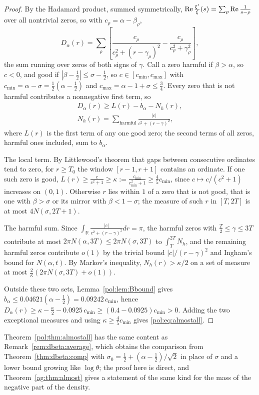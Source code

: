\begin{proof}
By the Hadamard product, summed symmetrically, $\operatorname{Re}\frac{\xi'}{\xi}(s)=\sum_\rho\operatorname{Re}\frac{1}{s-\rho}$ over all nontrivial zeros, so with $c_\rho=\alpha-\beta_\rho$,
\[
D_\alpha(r)=\sum_\rho\left[\frac{c_\rho}{c_\rho^2+(r-\gamma_\rho)^2}-\frac{c_\rho}{c_\rho^2+\gamma_\rho^2}\right],
\]
the sum running over zeros of both signs of $\gamma$. Call a zero harmful if $\beta>\alpha$, so $c<0$, and good if $|\beta-\frac12|\le\sigma-\frac12$, so $c\in[c_{\min},c_{\max}]$ with $c_{\min}=\alpha-\sigma=\frac12(\alpha-\frac12)$ and $c_{\max}=\alpha-1+\sigma\le\frac34$. Every zero that is not harmful contributes a nonnegative first term, so
\[
\begin{gathered}
D_\alpha(r)\ge L(r)-b_\alpha-N_h(r),\\
N_h(r)=\sum_{\text{harmful}}\frac{|c|}{c^2+(r-\gamma)^2},
\end{gathered}
\]
where $L(r)$ is the first term of any one good zero; the second terms of all zeros, harmful ones included, sum to $b_\alpha$.

The local term. By Littlewood's theorem \cite{Littlewood24} that gaps between consecutive ordinates tend to zero, for $r\ge T_0$ the window $[r-1,r+1]$ contains an ordinate. If one such zero is good, $L(r)\ge\frac{c}{c^2+1}\ge\kappa:=\frac{c_{\min}}{c_{\min}^2+1}\ge\frac45c_{\min}$, since $c\mapsto c/(c^2+1)$ increases on $(0,1)$. Otherwise $r$ lies within $1$ of a zero that is not good, that is one with $\beta>\sigma$ or its mirror with $\beta<1-\sigma$; the measure of such $r$ in $[T,2T]$ is at most $4N(\sigma,2T+1)$.

The harmful sum. Since $\int_{\mathbb R}\frac{|c|}{c^2+(r-\gamma)^2}dr=\pi$, the harmful zeros with $\frac T2\le\gamma\le3T$ contribute at most $2\pi N(\alpha,3T)\le2\pi N(\sigma,3T)$ to $\int_T^{2T}N_h$, and the remaining harmful zeros contribute $o(1)$ by the trivial bound $|c|/(r-\gamma)^2$ and Ingham's bound for $N(\alpha,t)$. By Markov's inequality, $N_h(r)>\kappa/2$ on a set of measure at most $\frac2\kappa(2\pi N(\sigma,3T)+o(1))$.

Outside these two sets, Lemma~\ref{pol:lem:Bbound} gives $b_\alpha\le0.04621(\alpha-\frac12)=0.09242\,c_{\min}$, hence $D_\alpha(r)\ge\kappa-\frac\kappa2-0.0925\,c_{\min}\ge(0.4-0.0925)c_{\min}>0$. Adding the two exceptional measures and using $\kappa\ge\frac45c_{\min}$ gives \eqref{pol:eq:almostall}.
\end{proof}

Theorem~\ref{pol:thm:almostall} has the same content as Remark~\ref{rem:dbeta:average}, which obtains the comparison from Theorem~\ref{thm:dbeta:comp} with $\sigma_0=\frac12+(\alpha-\frac12)/\sqrt2$ in place of $\sigma$ and a lower bound growing like $\log\theta$; the proof here is direct, and Theorem~\ref{ag:thm:almost} gives a statement of the same kind for the mass of the negative part of the density.

